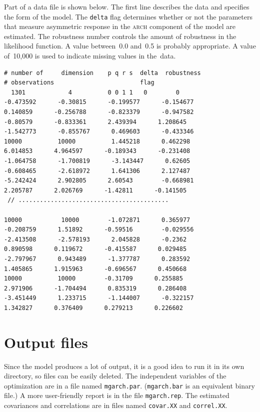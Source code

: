 {Part of a data file is shown below. The first line describes the data
and specifies the form of the model. The \texttt{delta} flag determines whether or not
the parameters that measure asymmetric response in the \textsc{arch} component of the
model are estimated. The robustness number controls the amount of
robustness in the likelihood function. A value between~0.0 and~0.5 is
probably appropriate. A value of~10,000 is used to indicate missing values
in the~data.
\begin{lstlisting}
# number of     dimension    p q r s  delta  robustness
# observations                        flag
  1301            4          0 0 1 1   0        0
-0.473592      -0.30815      -0.199577      -0.154677
0.140859      -0.256788      -0.823379      -0.947582
-0.80579      -0.833361      2.439394      1.208645
-1.542773      -0.855767      0.469603      -0.433346
10000          10000          1.445218      0.462298
6.014853      4.964597      -0.189343      -0.231408
-1.064758      -1.700819      -3.143447      0.62605
-0.608465      -2.618972      1.641306      2.127487
-5.242424      2.902805      2.60543        -0.668981
2.205787      2.026769      -1.42811      -0.141505
 // ..........................................

10000           10000        -1.072871      0.365977
-0.208759      1.51892      -0.59516        -0.029556
-2.413508      -2.578193      2.045828      -0.2362
0.890598      0.119672      -0.415587      0.029485
-2.797967      0.943489      -1.377787      0.283592
1.405865      1.915963      -0.696567      0.450668
10000          10000        -0.31709      0.255885
2.971906      -1.704494      0.835319      0.286408
-3.451449      1.233715      -1.144007      -0.322157
1.342827      0.376409      0.279213      0.226602
\end{lstlisting}


\section{Output files}

Since the model produces a lot of output, it is a good idea to run it in its own directory,
so files can be easily deleted. The independent variables of the
optimization are in a file named \texttt{mgarch.par}. (\texttt{mgarch.bar} is an equivalent binary file.)
A more user-friendly report is in the file \texttt{mgarch.rep}.
The estimated covariances and correlations are in files named \texttt{covar.XX} and \texttt{correl.XX}.

}
